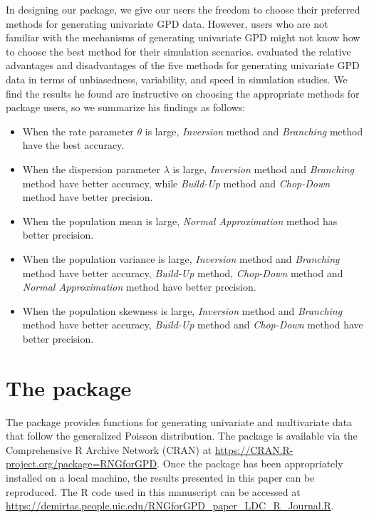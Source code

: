 \noindent In designing our package, we give our users the freedom to choose their preferred methods for generating univariate GPD data. However, users who are not familiar with the mechanisms of generating univariate GPD might not know how to choose the best method for their simulation scenarios. \cite{hakan} evaluated the relative advantages and disadvantages of the five methods for generating univariate GPD data in terms of unbiasedness, variability, and speed in simulation studies. We find the results he found are instructive on choosing the appropriate methods for package users, so we summarize his findings as follows:

\begin{itemize}
  \item When the rate parameter $\theta$ is large, \textit{Inversion} method and \textit{Branching} method have the best accuracy.
  \item When the dispersion parameter $\lambda$ is large, \textit{Inversion} method and \textit{Branching} method have better accuracy, while \textit{Build-Up} method and \textit{Chop-Down} method have better precision.
  \item When the population mean is large, \textit{Normal Approximation} method has better precision.
  \item When the population variance is large, \textit{Inversion} method and \textit{Branching} method have better accuracy, \textit{Build-Up} method, \textit{Chop-Down} method and \textit{Normal Approximation} method have better precision.
  \item When the population skewness is large, \textit{Inversion} method and \textit{Branching} method have better accuracy, \textit{Build-Up} method and \textit{Chop-Down} method have better precision. 
\end{itemize}

\section{The  package}

The  package provides functions for generating univariate and multivariate data that follow the generalized Poisson distribution. The package is available via the Comprehensive R Archive Network (CRAN) at \url{https://CRAN.R-project.org/package=RNGforGPD}. Once the package has been appropriately installed on a local machine, the results presented in this paper can be reproduced. The R code used in this manuscript can be accessed at \url{https://demirtas.people.uic.edu/RNGforGPD_paper_LDC_R_Journal.R}.

